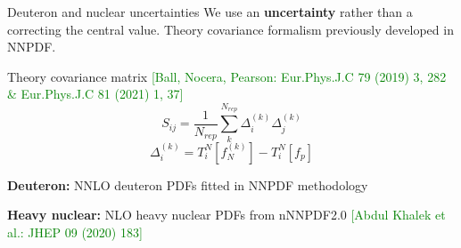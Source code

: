 \author[Rosalyn Pearson]{}


\begin{frame}[fragile]{Deuteron and nuclear uncertainties}
We use an {\bf uncertainty} rather than a correcting the central value.
\newline
Theory covariance formalism previously developed in NNPDF.
      \begin{block}{Theory covariance matrix \tiny{ \textcolor{green}{[Ball, Nocera, Pearson: Eur.Phys.J.C 79 (2019) 3, 282 \& Eur.Phys.J.C 81 (2021) 1, 37]}}}
        \begin{equation}
            S_{ij} = \frac{1}{N_{rep}} \sum_k^{N_{rep}} \Delta_i^{(k)}\Delta_j^{(k)}
        \end{equation}
        \begin{equation}
            \Delta_i^{(k)} = T_i^{N}[f_{N}^{(k)}] - T_i^{N}[f_{p}]
        \end{equation}
      \end{block}
      
    \textbf{Deuteron:} NNLO deuteron PDFs fitted in NNPDF methodology 
    
    \textbf{Heavy nuclear:} NLO heavy nuclear PDFs from nNNPDF2.0 \tiny{ \textcolor{green}{[Abdul Khalek et al.: JHEP 09 (2020) 183]}}
  \begin{table}
    \caption{$\chi^2$ per deuteron/nuclear dataset}
  \end{table}
\end{frame}

